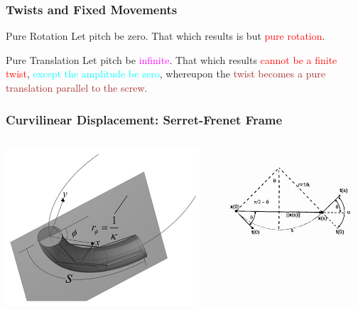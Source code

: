 \begin{frame}
	\frametitle{Twists and Fixed Movements}
	\begin{block}{Pure Rotation}
		Let pitch be \textcolor{light-blue}{zero}. That which results is but \textcolor{red}{pure rotation}.
	\end{block}
	
	\begin{block}{Pure Translation}
		Let pitch be \textcolor{magenta}{infinite}. That which results \textcolor{red}{cannot be a finite twist}, \textcolor{cyan}{except the amplitude be zero}, whereupon the \textcolor{brown}{twist becomes a pure translation parallel to the screw}.
	\end{block}
\end{frame}

%
\begin{frame}
	\frametitle{Curvilinear Displacement: Serret-Frenet Frame}
	\begin{columns}[]
		\begin{column}{.5\linewidth}
			\centering
			\includegraphics[width=\textwidth]{figures/multi_sec_manip.jpg}
		\end{column}
		\begin{column}{.68\linewidth}
			\centering
			\includegraphics[width=\textwidth]{figures/serret.jpg}

\end{column}
\end{columns}
\end{frame}
